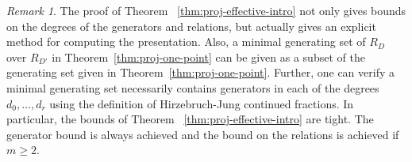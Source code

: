 \documentclass{amsart}
\theoremstyle{plain}
\theoremstyle{definition}
\theoremstyle{remark}
\newtheorem{rem}[thm]{Remark}
\numberwithin{equation}{subsection}
\begin{document}
\begin{rem}
\label{rem:exact-effective-bounds}
The proof of Theorem ~\ref{thm:proj-effective-intro} not only gives bounds on the degrees of the generators and relations, but actually gives an explicit method for computing the presentation. 
Also, a minimal generating set of $R_D$ over $R_{D'}$ in 
Theorem~\ref{thm:proj-one-point}
can be given as a subset of the generating set given in 
Theorem~\ref{thm:proj-one-point}. Further,
one can verify a minimal generating
set necessarily contains generators in each of the degrees $d_0, \ldots, d_r$
using the definition of 
Hirzebruch-Jung continued fractions.
In particular,
the bounds of
Theorem ~\ref{thm:proj-effective-intro}
are tight. The generator bound is always achieved and the bound on the relations is achieved if $m \geq 2$.
\end{rem}
\end{document}

